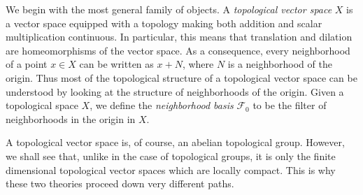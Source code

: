 We begin with the most general family of objects.
A \emph{topological vector space} $X$ is a vector space equipped with a topology making both addition and scalar multiplication continuous.
In particular, this means that translation and dilation are homeomorphisms of the vector space.
As a consequence, every neighborhood of a point $x \in X$ can be written as $x + N$, where $N$ is a neighborhood of the origin. Thus most of the topological structure of a topological vector space can be understood by looking at the structure of neighborhoods of the origin. Given a topological space $X$, we define the \emph{neighborhood basis} $\mathcal{F}_0$ to be the filter of neighborhoods in the origin in $X$.

\begin{remark}
    A topological vector space is, of course, an abelian topological group. However, we shall see that, unlike in the case of topological groups, it is only the finite dimensional topological vector spaces which are locally compact. This is why these two theories proceed down very different paths.
\end{remark}

%
%

